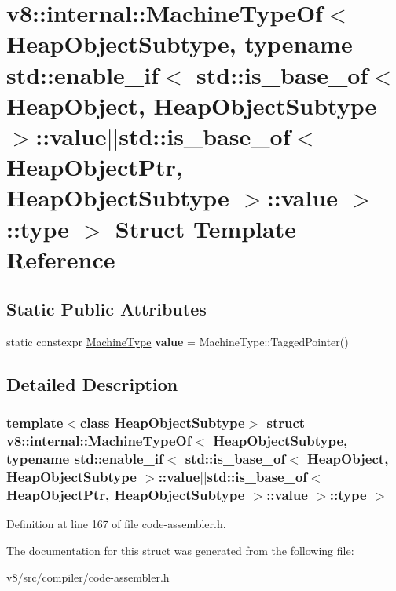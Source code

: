 \hypertarget{structv8_1_1internal_1_1MachineTypeOf_3_01HeapObjectSubtype_00_01typename_01std_1_1enable__if_3_28c6b20fa6261d8492d987b65ff7d1c2}{}\section{v8\+:\+:internal\+:\+:Machine\+Type\+Of$<$ Heap\+Object\+Subtype, typename std\+:\+:enable\+\_\+if$<$ std\+:\+:is\+\_\+base\+\_\+of$<$ Heap\+Object, Heap\+Object\+Subtype $>$\+:\+:value$\vert$$\vert$std\+:\+:is\+\_\+base\+\_\+of$<$ Heap\+Object\+Ptr, Heap\+Object\+Subtype $>$\+:\+:value $>$\+:\+:type $>$ Struct Template Reference}
\label{structv8_1_1internal_1_1MachineTypeOf_3_01HeapObjectSubtype_00_01typename_01std_1_1enable__if_3_28c6b20fa6261d8492d987b65ff7d1c2}
\subsection*{Static Public Attributes}
\begin{DoxyCompactItemize}
\item 
\mbox{\label{structv8_1_1internal_1_1MachineTypeOf_3_01HeapObjectSubtype_00_01typename_01std_1_1enable__if_3_28c6b20fa6261d8492d987b65ff7d1c2_a0192b0ce6360700cf27adc7307bbc8c2}} 
static constexpr \mbox{\hyperlink{classv8_1_1internal_1_1MachineType}{Machine\+Type}} {\bfseries value} = Machine\+Type\+::\+Tagged\+Pointer()
\end{DoxyCompactItemize}


\subsection{Detailed Description}
\subsubsection*{template$<$class Heap\+Object\+Subtype$>$\newline
struct v8\+::internal\+::\+Machine\+Type\+Of$<$ Heap\+Object\+Subtype, typename std\+::enable\+\_\+if$<$ std\+::is\+\_\+base\+\_\+of$<$ Heap\+Object, Heap\+Object\+Subtype $>$\+::value$\vert$$\vert$std\+::is\+\_\+base\+\_\+of$<$ Heap\+Object\+Ptr, Heap\+Object\+Subtype $>$\+::value $>$\+::type $>$}



Definition at line 167 of file code-\/assembler.\+h.



The documentation for this struct was generated from the following file\+:\begin{DoxyCompactItemize}
\item 
v8/src/compiler/code-\/assembler.\+h\end{DoxyCompactItemize}
